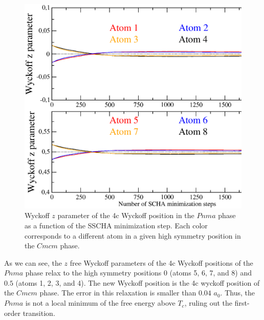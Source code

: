 \begin{figure}[h]
\begin{center}
\includegraphics[width=0.9\linewidth]{Figures/positions.eps}
	\caption[Wyckoff $z$ parameter of the 4c Wyckoff position in $Pnma$ SnSe]{Wyckoff $z$ parameter of the 4c 
	Wyckoff position in the $Pnma$ phase as a function of the SSCHA minimization step. Each color corresponds 
	to a different atom in a given high symmetry position in the $Cmcm$ phase.}
\label{atomic-relaxation}
\end{center}
\end{figure}
As we can see, the $z$ free Wyckoff parameters of the 4c Wyckoff positions of the $Pnma$ phase relax to the 
high symmetry positions $0$ (atoms 5, 6, 7, and 8) and $0.5$ (atoms 1, 2, 3, and 4). The new Wyckoff position is the 
4c wyckoff position of the $Cmcm$ phase. The error in this relaxation is smaller than $0.04$ $a_{0}$. Thus, the 
$Pnma$ is not a local minimum of the free energy above $T_{c}$, ruling out the first-order transition. \\ 

